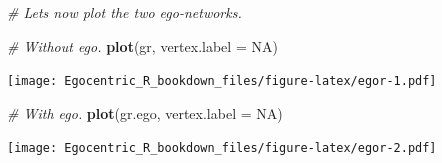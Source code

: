 \documentclass[
]{book}
\newenvironment{Shaded}{\begin{snugshade}}{\end{snugshade}}
\newcommand{\AttributeTok}[1]{\textcolor[rgb]{0.13,0.29,0.53}{#1}}
\newcommand{\CommentTok}[1]{\textcolor[rgb]{0.56,0.35,0.01}{\textit{#1}}}
\newcommand{\ConstantTok}[1]{\textcolor[rgb]{0.56,0.35,0.01}{#1}}
\newcommand{\FunctionTok}[1]{\textcolor[rgb]{0.13,0.29,0.53}{\textbf{#1}}}
\newcommand{\NormalTok}[1]{#1}
\begin{document}
\begin{Shaded}
\begin{Highlighting}[]
\CommentTok{\# Let\textquotesingle{}s now plot the two ego{-}networks.}

\CommentTok{\# Without ego.}
\FunctionTok{plot}\NormalTok{(gr, }\AttributeTok{vertex.label =} \ConstantTok{NA}\NormalTok{)}
\end{Highlighting}
\end{Shaded}

\texttt{[image: Egocentric\_R\_bookdown\_files/figure-latex/egor-1.pdf]}

\begin{Shaded}
\begin{Highlighting}[]
\CommentTok{\# With ego.}
\FunctionTok{plot}\NormalTok{(gr.ego, }\AttributeTok{vertex.label =} \ConstantTok{NA}\NormalTok{)}
\end{Highlighting}
\end{Shaded}

\texttt{[image: Egocentric\_R\_bookdown\_files/figure-latex/egor-2.pdf]}
\end{document}
